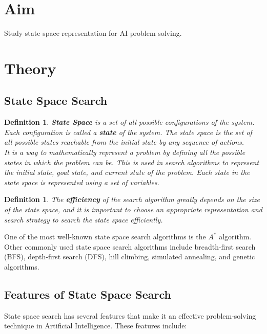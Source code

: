 \documentclass[11pt]{article}
\newtheorem{dfn}[thm]{Definition}
\begin{document}
\tableofcontents
\thispagestyle{empty}
\clearpage

\setcounter{page}{1}

\section{Aim}
Study state space representation for AI problem solving.

\section{Theory}

\subsection{State Space Search}
\begin{dfn}
    \textbf{State Space} is a set of all possible configurations of the system. Each configuration is called a \textbf{state} of the system. The state space is the set of all possible states reachable from the initial state by any sequence of actions.\\

    \noindent
    It is a way to mathematically represent a problem by defining all the possible states
    in which the problem can be. This is used in search algorithms to represent the initial state, goal
    state, and current state of the problem. Each state in the state space is represented using a set of
    variables.
\end{dfn}

\begin{dfn}
    The \textbf{efficiency} of the search algorithm greatly depends on the size of the state space, and it is
    important to choose an appropriate representation and search strategy to search the state space
    efficiently.
\end{dfn}

One of the most well-known state space search algorithms is the $A^*$ algorithm. Other commonly
used state space search algorithms include breadth-first search (BFS), depth-first search
(DFS), hill climbing, simulated annealing, and genetic algorithms.

\subsection{Features of State Space Search}
State space search has several features that make it an effective problem-solving technique in
Artificial Intelligence. These features include:
\end{document}
